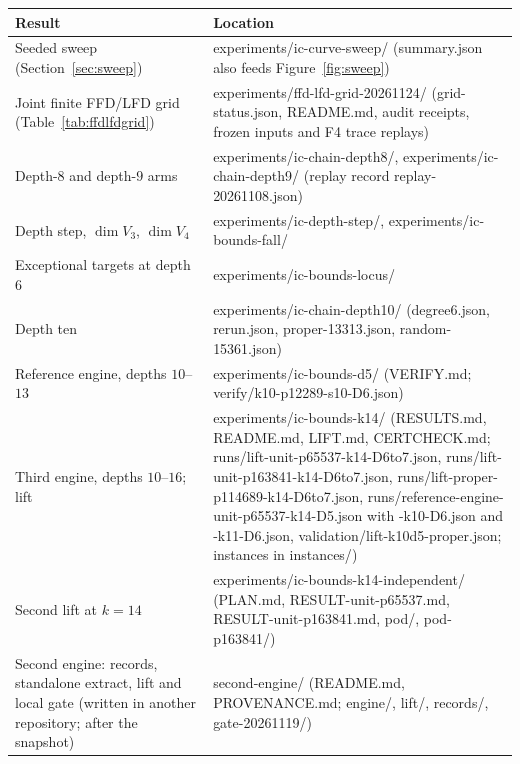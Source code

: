 \documentclass[11pt]{article}
\theoremstyle{definition}\newtheorem{definition}[theorem]{Definition}
\theoremstyle{remark}\newtheorem{remark}[theorem]{Remark}
\newcommand{\codeus}{\textunderscore\allowbreak}
\newcommand{\code}[1]{{\ttfamily\let\_\codeus#1}}
\begin{document}
\begin{table}[!ht]
\centering\scriptsize
\setlength{\tabcolsep}{3pt}
\begin{tabular}{p{5.6cm}p{9.0cm}}
\toprule
Result & Location\\
\midrule
Seeded sweep (Section~\ref{sec:sweep}) & \code{experiments/\allowbreak{}ic-curve-sweep/} (\code{summary.json} also feeds Figure~\ref{fig:sweep})\\
Joint finite FFD/LFD grid (Table~\ref{tab:ffdlfdgrid}) & \code{experiments/\allowbreak{}ffd-lfd-grid-20261124/} (\code{grid-status.json}, \code{README.md}, audit receipts, frozen inputs and F4 trace replays)\\
Depth-$8$ and depth-$9$ arms & \code{experiments/\allowbreak{}ic-chain-depth8/}, \code{experiments/\allowbreak{}ic-chain-depth9/} (replay record \code{replay-20261108.json})\\
Depth step, $\dim V_3$, $\dim V_4$ & \code{experiments/\allowbreak{}ic-depth-step/}, \code{experiments/\allowbreak{}ic-bounds-fall/}\\
Exceptional targets at depth $6$ & \code{experiments/\allowbreak{}ic-bounds-locus/}\\
Depth ten & \code{experiments/\allowbreak{}ic-chain-depth10/} (\code{degree6.json}, \code{rerun.json}, \code{proper-13313.json}, \code{random-15361.json})\\
Reference engine, depths $10$--$13$ & \code{experiments/\allowbreak{}ic-bounds-d5/} (\code{VERIFY.md}; \code{verify/k10-p12289-s10-D6.json})\\
Third engine, depths $10$--$16$; lift & \code{experiments/\allowbreak{}ic-bounds-k14/} (\code{RESULTS.md}, \code{README.md}, \code{LIFT.md}, \code{CERTCHECK.md}; \code{runs/lift-unit-p65537-k14-D6to7.json}, \code{runs/lift-unit-p163841-k14-D6to7.json}, \code{runs/lift-proper-p114689-k14-D6to7.json}, \code{runs/reference-engine-unit-p65537-k14-D5.json} with \code{-k10-D6.json} and \code{-k11-D6.json}, \code{validation/lift-k10d5-proper.json}; instances in \code{instances/})\\
Second lift at $k=14$ & \code{experiments/\allowbreak{}ic-bounds-k14-independent/} (\code{PLAN.md}, \code{RESULT-unit-p65537.md}, \code{RESULT-unit-p163841.md}, \code{pod/}, \code{pod-p163841/})\\
Second engine: records, standalone extract, lift and local gate (written in another repository; after the snapshot) & \code{second-engine/} (\code{README.md}, \code{PROVENANCE.md}; \code{engine/}, \code{lift/}, \code{records/}, \code{gate-20261119/})\\

\end{tabular}
\end{table}
\end{document}
